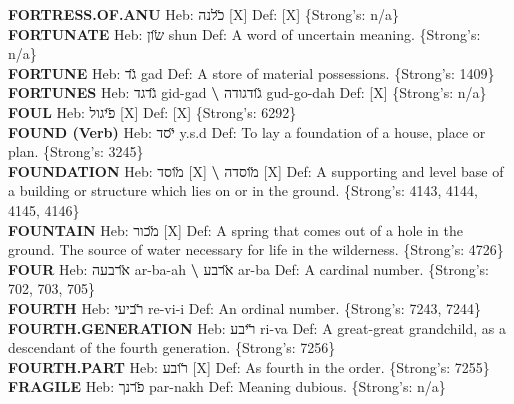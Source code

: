 {\textbf{FORTRESS.OF.ANU} Heb: {\large\H כלנה} {[}X{]} Def: {[}X{]} \{Strong's: n/a\}\hfill{}\\

\textbf{FORTUNATE} Heb: {\large\H שון} shun Def: A word of uncertain meaning. \{Strong's: n/a\}\hfill{}\\

\textbf{FORTUNE} Heb: {\large\H גד} gad Def: A store of material possessions. \{Strong's: 1409\}\hfill{}\\

\textbf{FORTUNES} Heb: {\large\H גדגד} gid-gad \textbf{\textbackslash{}} {\large\H גודגודה} gud-go-dah Def: {[}X{]} \{Strong's: n/a\}\hfill{}\\

\textbf{FOUL} Heb: {\large\H פיגול} {[}X{]} Def: {[}X{]} \{Strong's: 6292\}\hfill{}\\

\textbf{FOUND (Verb)} Heb: {\large\H יסד} y.s.d Def: To lay a foundation of a house, place or plan. \{Strong's: 3245\}\hfill{}\\

\textbf{FOUNDATION} Heb: {\large\H מוסד} {[}X{]} \textbf{\textbackslash{}} {\large\H מוסדה} {[}X{]} Def: A supporting and level base of a building or structure which lies on or in the ground. \{Strong's: 4143, 4144, 4145, 4146\}\hfill{}\\

\textbf{FOUNTAIN} Heb: {\large\H מכור} {[}X{]} Def: A spring that comes out of a hole in the ground. The source of water necessary for life in the wilderness. \{Strong's: 4726\}\hfill{}\\

\textbf{FOUR} Heb: {\large\H ארבעה} ar-ba-ah \textbf{\textbackslash{}} {\large\H ארבע} ar-ba Def: A cardinal number. \{Strong's: 702, 703, 705\}\hfill{}\\

\textbf{FOURTH} Heb: {\large\H רביעי} re-vi-i Def: An ordinal number. \{Strong's: 7243, 7244\}\hfill{}\\

\textbf{FOURTH.GENERATION} Heb: {\large\H ריבע} ri-va Def: A great-great grandchild, as a descendant of the fourth generation. \{Strong's: 7256\}\hfill{}\\

\textbf{FOURTH.PART} Heb: {\large\H רובע} {[}X{]} Def: As fourth in the order. \{Strong's: 7255\}\hfill{}\\

\textbf{FRAGILE} Heb: {\large\H פרנך} par-nakh Def: Meaning dubious. \{Strong's: n/a\}\hfill{}\\

}
